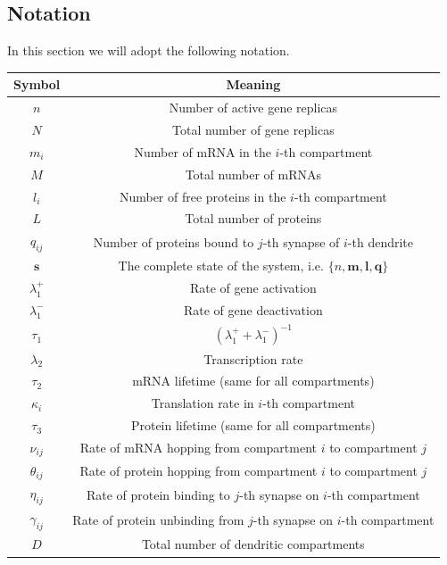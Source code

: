 \documentclass[a4paper, 11pt]{article}
\begin{document}
\subsection{Notation}
In this section we will adopt the following notation.
\begin{center}
  \begin{tabular}{|c|c|}
    \hline
        {\bf Symbol}         &{\bf Meaning}\\ \hline
        $n$                 &Number of active gene replicas \\ \hline
        $N$                 &Total number of gene replicas \\ \hline
        $m_i$               &Number of mRNA in the $i$-th compartment \\ \hline
        $M$                 &Total number of mRNAs\\ \hline
        $l_i$               &Number of free proteins in the $i$-th compartment\\ \hline
        $L$                 &Total number of proteins\\ \hline
        $q_{ij}$            &Number of proteins bound to $j$-th synapse of $i$-th dendrite\\ \hline
        $\mathbf s$        &The complete state of the system, i.e. $\{n, \mathbf m,\mathbf l, \mathbf q\}$\\ \hline
        $\lambda_1^+$        &Rate of gene activation\\ \hline
        $\lambda_1^-$        &Rate of gene deactivation\\ \hline
        $\tau_1$           &$(\lambda_1^+ + \lambda_1^-)^{-1}$\\ \hline
        $\lambda_2$        &Transcription rate\\ \hline
        $\tau_2$           &mRNA lifetime (same for all compartments)\\ \hline
        $\kappa_i$          &Translation rate in $i$-th compartment\\ \hline
        $\tau_3$          &Protein lifetime (same for all compartments)\\ \hline
        $\nu_{ij}$         &Rate of mRNA hopping from compartment $i$ to compartment $j$ \\ \hline
        $\theta_{ij}$      &Rate of protein hopping from compartment $i$ to compartment $j$ \\ \hline
        $\eta_{ij}$        &Rate of protein binding to $j$-th synapse on $i$-th compartment \\ \hline
        $\gamma_{ij}$        &Rate of protein unbinding from $j$-th synapse on $i$-th compartment \\ \hline
        $D$                 &Total number of dendritic compartments \\ \hline
  \end{tabular}
\end{center}
\end{document}
